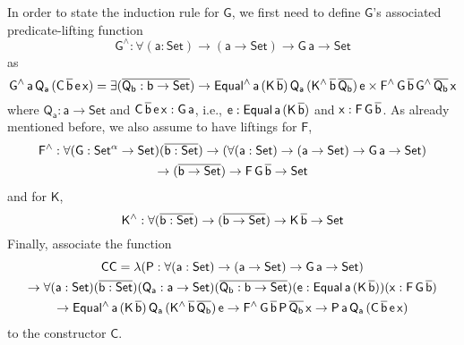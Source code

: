 \documentclass[acmsmall,screen,review,anonymous]{acmart}
\theoremstyle{definition}
\begin{document}
In order to state the induction rule for $\mathsf{G}$,
we first need to define $\mathsf{G}$'s associated predicate-lifting function 
\[
\mathsf{G^{\wedge} : \forall (a : Set) \to (a \to Set) \to G\,a \to Set}
\]
as
\[
\mathsf{G^{\wedge}\,a\,Q_a\,(C\,\overline{b}\,e\,x)
= \exists (\overline{Q_b : b \to Set})
\to Equal^{\wedge}\,a\,(K\,\overline{b})\,Q_a\,(K^{\wedge}\,\overline{b}\,\overline{Q_b})\,e
\times F^{\wedge}\,G\,\overline{b}\,G^{\wedge}\,{\overline{Q_b}}\,x}
\]
where $\mathsf{Q_a : a \to Set}$
and $\mathsf{C\,\overline{b}\,e\,x : G\,a}$,
i.e., $\mathsf{e : Equal\,a\,(K\,\overline{b})}$ and $\mathsf{x : F\,G\,\overline{b}}$.
As already mentioned before, we also assume to have liftings for $\mathsf{F}$,
\begin{multline*}
\mathsf{F^{\wedge} : \forall (G : Set^{\alpha} \to Set) (\overline{b : Set})
\to (\forall (a : Set) \to (a \to Set) \to G\,a \to Set)} \\
\mathsf{\to (\overline{b \to Set})
\to F\,G\,\overline{b} \to Set}
\end{multline*}
and for  $\mathsf{K}$,
\[
\mathsf{K^{\wedge} : \forall (\overline{b : Set}) \to (\overline{b \to Set}) \to K\,\overline{b} \to Set}
\]
Finally, associate the function
\begin{multline*}
\mathsf{CC = \lambda (P : \forall (a : Set) \to (a \to Set) \to G\,a \to Set)} \\
\mathsf{\to \forall (a : Set) (\overline{b : Set}) (Q_a : a \to Set) (\overline{Q_b : b \to Set}) (e : Equal\,a\,(K\,\overline{b})) (x : F\,G\,\overline{b})} \\
\mathsf{\to Equal^{\wedge}\,a\,(K\,\overline{b})\,Q_a\,(K^{\wedge}\,\overline{b}\,\overline{Q_b})\,e
	\to F^{\wedge}\,G\,\overline{b}\,P\,\overline{Q_b}\,x
	\to P\,a\,Q_a\,(C\,\overline{b}\,e\,x)}
\end{multline*}
to the constructor $\mathsf{C}$.
\end{document}
